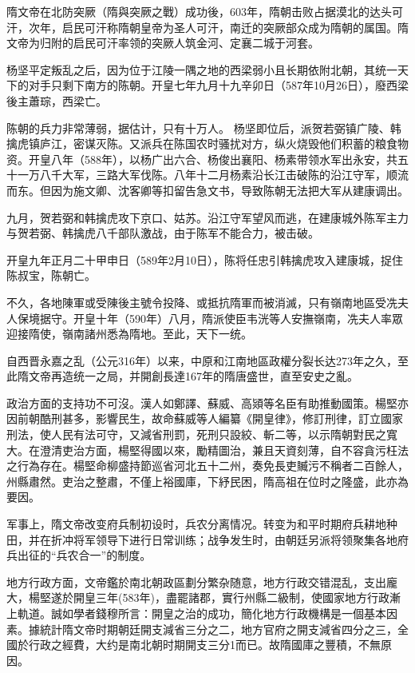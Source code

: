 隋文帝在北防突厥（隋與突厥之戰）成功後，603年，隋朝击败占据漠北的达头可汗，次年，启民可汗称隋朝皇帝为圣人可汗，南迁的突厥部众成为隋朝的属国。隋文帝为归附的启民可汗率领的突厥人筑金河、定襄二城于河套。

杨坚平定叛乱之后，因为位于江陵一隅之地的西梁弱小且长期依附北朝，其统一天下的对手只剩下南方的陈朝。开皇七年九月十九辛卯日（587年10月26日），廢西梁後主蕭琮，西梁亡。

陈朝的兵力非常薄弱，据估计，只有十万人。 杨坚即位后，派贺若弼镇广陵、韩擒虎镇庐江，密谋灭陈。又派兵在陈国农时骚扰对方，纵火烧毁他们积蓄的粮食物资。开皇八年（588年），以杨广出六合、杨俊出襄阳、杨素带领水军出永安，共五十一万八千大军，三路大军伐陈。八年十二月杨素沿长江击破陈的沿江守军，顺流而东。但因为施文卿、沈客卿等扣留告急文书，导致陈朝无法把大军从建康调出。

九月，贺若弼和韩擒虎攻下京口、姑苏。沿江守军望风而逃，在建康城外陈军主力与贺若弼、韩擒虎八千部队激战，由于陈军不能合力，被击破。

开皇九年正月二十甲申日（589年2月10日），陈将任忠引韩擒虎攻入建康城，捉住陈叔宝，陈朝亡。

不久，各地陳軍或受陳後主號令投降、或抵抗隋軍而被消滅，只有嶺南地區受冼夫人保境据守。开皇十年（590年）八月，隋派使臣韦洸等人安撫嶺南，冼夫人率眾迎接隋使，嶺南諸州悉為隋地。至此，天下一统。

自西晋永嘉之乱（公元316年）以来，中原和江南地區政權分裂长达273年之久，至此隋文帝再造统一之局，并開創長達167年的隋唐盛世，直至安史之亂。

政治方面的支持功不可沒。漢人如鄭譯、蘇威、高熲等名臣有助推動國策。楊堅亦因前朝酷刑甚多，影響民生，故命蘇威等人編纂《開皇律》，修訂刑律，訂立國家刑法，使人民有法可守，又減省刑罰，死刑只設絞、斬二等，以示隋朝對民之寬大。在澄清吏治方面，楊堅得國以來，勵精圖治，兼且天資刻薄，自不容貪污枉法之行為存在。楊堅命柳盛持節巡省河北五十二州，奏免長吏贓污不稱者二百餘人，州縣肅然。吏治之整肅，不僅上裕國庫，下紓民困，隋高祖在位时之隆盛，此亦為要因。

军事上，隋文帝改变府兵制初设时，兵农分离情况。转变为和平时期府兵耕地种田，并在折冲将军领导下进行日常训练；战争发生时，由朝廷另派将领聚集各地府兵出征的“兵农合一”的制度。

地方行政方面，文帝鑑於南北朝政區劃分繁杂随意，地方行政交错混乱，支出龐大，楊堅遂於開皇三年(583年)，盡罷諸郡，實行州縣二級制，使國家地方行政漸上軌道。誠如學者錢穆所言：開皇之治的成功，簡化地方行政機構是一個基本因素。據統計隋文帝时期朝廷開支減省三分之二，地方官府之開支減省四分之三，全國於行政之經費，大约是南北朝时期開支三分1而已。故隋國庫之豐積，不無原因。

